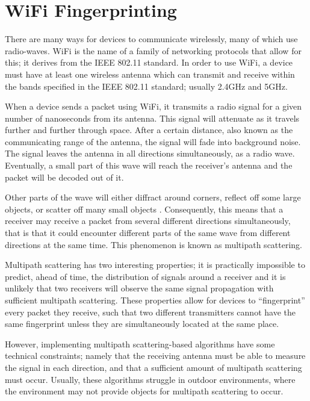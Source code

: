 
\section{WiFi Fingerprinting} \label{section:related_work}

There are many ways for devices to communicate wirelessly, many of which use radio-waves. WiFi is the name of a family of networking protocols that allow for this; it derives from the IEEE 802.11 standard. In order to use WiFi, a device must have at least one wireless antenna which can transmit and receive within the bands specified in the IEEE 802.11 standard; usually 2.4GHz and 5GHz.

When a device sends a packet using WiFi, it transmits a radio signal for a given number of nanoseconds from its antenna. This signal will attenuate as it travels further and further through space. After a certain distance, also known as the communicating range of the antenna, the signal will fade into background noise. The signal leaves the antenna in all directions simultaneously, as a radio wave. Eventually, a small part of this wave will reach the receiver's antenna and the packet will be decoded out of it.

Other parts of the wave will either diffract around corners, reflect off some large objects, or scatter off many small objects \cite{SignalProp}. Consequently, this means that a receiver may receive a packet from several different directions simultaneously, that is that it could encounter different parts of the same wave from different directions at the same time. This phenomenon is known as multipath scattering. %

Multipath scattering has two interesting properties; it is practically impossible to predict, ahead of time, the distribution of signals around a receiver and it is unlikely that two receivers will observe the same signal propagation with sufficient multipath scattering. These properties allow for devices to ``fingerprint'' every packet they receive, such that two different transmitters cannot have the same fingerprint unless they are simultaneously located at the same place. 

However, implementing multipath scattering-based algorithms have some technical constraints; namely that the receiving antenna must be able to measure the signal in each direction, and that a sufficient amount of multipath scattering must occur. Usually, these algorithms struggle in outdoor environments, where the environment may not provide objects for multipath scattering to occur.

